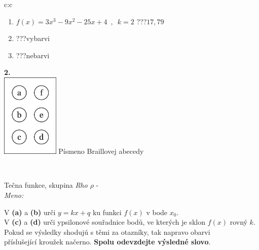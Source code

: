 \documentclass[10pt]{report}
\begin{document}
\begin{tabular}{c:c}
\begin{minipage}[c][104.5mm][t]{0.5\linewidth}
\begin{center}
\begin{minipage}{0.79\linewidth}
\begin{center}
\begin{varwidth}{\linewidth}
\begin{enumerate}
\item $f(x)=3x^3-9x^2-25x+4\enspace , \enspace k=2$\quad \dotfill\; ???\;\dotfill \quad $17 , 79$
\item \quad \dotfill\; ???\;\dotfill \quad vybarvi
\item \quad \dotfill\; ???\;\dotfill \quad nebarvi
\end{enumerate}
\end{varwidth}
\end{center}
\end{minipage}
\begin{minipage}{0.20\linewidth}
\begin{center}
{\Huge\bfseries 2.} \\[2mm]
\includegraphics[height=40mm]{../images/braille.png}
{\small Písmeno Braillovej abecedy}
\end{center}
\end{minipage}
\end{center}
\end{minipage}
\\ \hdashline
\begin{minipage}[c][104.5mm][t]{0.5\linewidth}
\begin{center}
\vspace{7mm}
{\huge Tečna funkce, skupina \textit{Rho $\rho$} -}\\[5mm]
\textit{Meno:}\phantom{xxxxxxxxxxxxxxxxxxxxxxxxxxxxxxxxxxxxxxxxxxxxxxxxxxxxxxxxxxxxxxxxx}\\[5mm]
\begin{minipage}{0.95\linewidth}
\begin{center}
V \textbf{(a)} a \textbf{(b)} urči  $y = kx + q$ ku funkci $f(x)$ v bode $x_0$.\\V \textbf{(c)} a \textbf{(d)} urči ypsilonové souřadnice bodů, ve kterých je sklon $f(x)$ rovný $k$.\\Pokud se výsledky shodujú s těmi za otazníky, tak napravo obarvi\\příslušející kroužek načerno. \textbf{Spolu odevzdejte výsledné slovo}.
\end{center}

\end{minipage}
\end{center}
\end{minipage}
\end{tabular}
\end{document}
